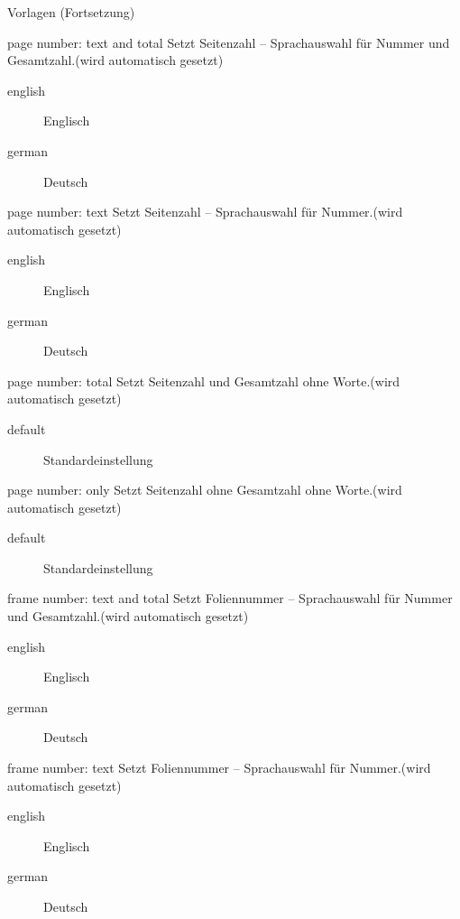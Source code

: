 \documentclass[presentation,t]{beamer}
\begin{document}
\begin{frame}[label=sec-2-2-5]{Vorlagen (Fortsetzung)}
\begin{block}{page number: text and total}
Setzt Seitenzahl – Sprachauswahl für Nummer und Gesamtzahl.(wird automatisch gesetzt)
\begin{description}
\item[{english}] Englisch
\item[{german}] Deutsch
\end{description}
\end{block}

\begin{block}{page number: text}
Setzt Seitenzahl – Sprachauswahl für Nummer.(wird automatisch gesetzt)
\begin{description}
\item[{english}] Englisch
\item[{german}] Deutsch
\end{description}
\end{block}

\begin{block}{page number: total}
Setzt Seitenzahl und Gesamtzahl ohne Worte.(wird automatisch gesetzt)
\begin{description}
\item[{default}] Standardeinstellung
\end{description}
\end{block}

\begin{block}{page number: only}
Setzt Seitenzahl ohne Gesamtzahl ohne Worte.(wird automatisch gesetzt)
\begin{description}
\item[{default}] Standardeinstellung
\end{description}
\end{block}

\begin{block}{frame number: text and total}
Setzt Foliennummer – Sprachauswahl für Nummer und Gesamtzahl.(wird automatisch gesetzt)
\begin{description}
\item[{english}] Englisch
\item[{german}] Deutsch
\end{description}
\end{block}

\begin{block}{frame number: text}
Setzt Foliennummer – Sprachauswahl für Nummer.(wird automatisch gesetzt)
\begin{description}
\item[{english}] Englisch
\item[{german}] Deutsch
\end{description}
\end{block}


\end{frame}
\end{document}
